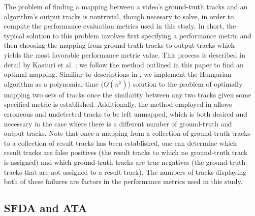 \documentclass[twocolumn, final]{svjour3}
\begin{document}
The problem of finding a mapping between a video's ground-truth tracks and an algorithm's output tracks is nontrivial, though necesary to solve, in order to compute the performance evaluation metrics used in this study. In short, the typical solution to this problem involves first specifying a performance metric and then choosing the mapping from ground-truth tracks to output tracks which yields the most favorable performance metric value. This process is described in detail by Kasturi et al. \cite{kasturi_2008}; we follow the method outlined in this paper to find an optimal mapping. Similiar to descriptions in \cite{kasturi_2008}, we implement the Hungarian algorithm \cite{munkres_1957} as a polynomial-time ($O(n^{3})$) solution to the problem of optimally mapping two sets of tracks once the similarity between any two tracks given some specified metric is established. Additionally, the method employed in \cite{kasturi_2008} allows erroneous and undetected tracks to be left unmapped, which is both desired and necessary in the case where there is a different number of ground-truth and output tracks. Note that once a mapping from a collection of ground-truth tracks to a collection of result tracks has been established, one can determine which result tracks are false positives (the result tracks to which no ground-truth track is assigned) and which ground-truth tracks are true negatives (the ground-truth tracks that are not assigned to a result track). The numbers of tracks displaying both of these failures are factors in the performance metrics used in this study.


\subsection{SFDA and ATA}
\end{document}
